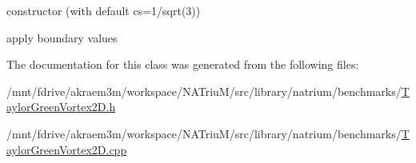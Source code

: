 constructor (with default cs=1/sqrt(3)) 

apply boundary values 

The documentation for this class was generated from the following files:\begin{DoxyCompactItemize}
\item 
/mnt/fdrive/akraem3m/workspace/NATriuM/src/library/natrium/benchmarks/\hyperlink{TaylorGreenVortex2D_8h}{TaylorGreenVortex2D.h}\item 
/mnt/fdrive/akraem3m/workspace/NATriuM/src/library/natrium/benchmarks/\hyperlink{TaylorGreenVortex2D_8cpp}{TaylorGreenVortex2D.cpp}\end{DoxyCompactItemize}
